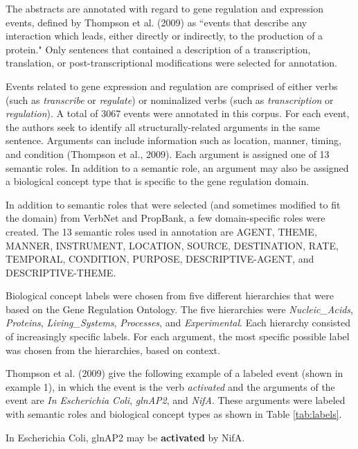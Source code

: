 \documentclass[11pt]{article}
\begin{document}

The abstracts are annotated with regard to gene regulation and expression events, defined by Thompson et al. (2009) as ``events that describe any interaction which leads, either directly or indirectly, to the production of a protein."  Only sentences that contained a description of a transcription, translation, or post-transcriptional modifications were selected for annotation.

Events related to gene expression and regulation are comprised of either verbs (such as {\it transcribe} or {\it regulate}) or nominalized verbs (such as {\it transcription} or {\it regulation}).  A total of 3067 events were annotated in this corpus.  For each event, the authors seek to identify all structurally-related arguments in the same sentence.  Arguments can include information such as location, manner, timing, and condition (Thompson et al., 2009).  Each argument is assigned one of 13 semantic roles.  In addition to a semantic role, an argument may also be assigned a biological concept type that is specific to the gene regulation domain. 

In addition to semantic roles that were selected (and sometimes modified to fit the domain) from VerbNet and PropBank,  a few domain-specific roles were created.  The 13 semantic roles used in annotation are AGENT, THEME, MANNER, INSTRUMENT, LOCATION, SOURCE, DESTINATION, RATE, TEMPORAL, CONDITION, PURPOSE, DESCRIPTIVE-AGENT, and DESCRIPTIVE-THEME.

Biological concept labels were chosen from five different hierarchies that were based on the Gene Regulation Ontology.  The five hierarchies were {\it Nucleic\_Acids}, {\it Proteins}, {\it Living\_Systems}, {\it Processes}, and {\it Experimental}.  Each hierarchy consisted of increasingly specific labels.  For each argument, the most specific possible label was chosen from the hierarchies, based on context.

Thompson et al. (2009) give the following example of a labeled event (shown in example 1), in which the event is the verb {\it activated} and the arguments of the event are {\it In Escherichia Coli}, {\it glnAP2},  and {\it NifA}.  These arguments were labeled with semantic roles and biological concept types as shown in Table \ref{tab:labels}.

\begin{exe}
	\ex In Escherichia Coli, glnAP2 may be {\bf activated} by NifA.
\end{exe}
\end{document}
